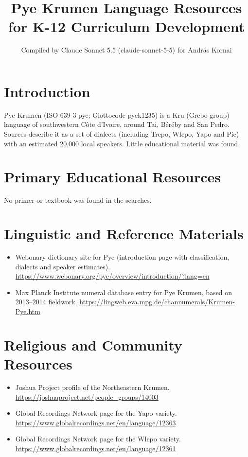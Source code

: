 \documentclass[12pt]{article}
\title{Pye Krumen Language Resources for K-12 Curriculum Development}
\author{Compiled by Claude Sonnet 5.5 (claude-sonnet-5-5) for Andr\'as Kornai}
\date{}
\begin{document}
\maketitle

\section{Introduction}
Pye Krumen (ISO 639-3 pye; Glottocode pyek1235) is a Kru (Grebo group) language of southwestern C\^ote d'Ivoire, around Tai, B\'er\'eby and San Pedro. Sources describe it as a set of dialects (including Trepo, Wlepo, Yapo and Pie) with an estimated 20,000 local speakers. Little educational material was found.

\section{Primary Educational Resources}
No primer or textbook was found in the searches.

\section{Linguistic and Reference Materials}
\begin{itemize}
\item Webonary dictionary site for Pye (introduction page with classification, dialects and speaker estimates). \url{https://www.webonary.org/pye/overview/introduction/?lang=en}
\item Max Planck Institute numeral database entry for Pye Krumen, based on 2013--2014 fieldwork. \url{https://lingweb.eva.mpg.de/channumerals/Krumen-Pye.htm}
\end{itemize}

\section{Religious and Community Resources}
\begin{itemize}
\item Joshua Project profile of the Northeastern Krumen. \url{https://joshuaproject.net/people_groups/14003}
\item Global Recordings Network page for the Yapo variety. \url{https://www.globalrecordings.net/en/language/12363}
\item Global Recordings Network page for the Wlepo variety. \url{https://www.globalrecordings.net/en/language/12361}
\end{itemize}
\end{document}
